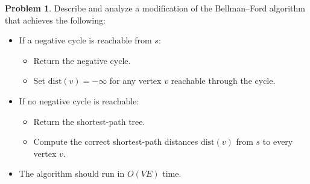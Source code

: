 \documentclass{article}
\theoremstyle{definition}
\newtheorem{problem}{Problem}
\begin{document}
\newpage


\begin{problem}
Describe and analyze a modification of the Bellman–Ford algorithm that achieves the following:
\begin{itemize}
    \item If a negative cycle is reachable from \( s \):
    \begin{itemize}
        \item Return the negative cycle.
        \item Set \( \text{dist}(v) = -\infty \) for any vertex \( v \) reachable through the cycle.
    \end{itemize}
    \item If no negative cycle is reachable:
    \begin{itemize}
        \item Return the shortest-path tree.
        \item Compute the correct shortest-path distances \( \text{dist}(v) \) from \( s \) to every vertex \( v \).
    \end{itemize}
    \item The algorithm should run in \( O(VE) \) time.
\end{itemize}


\end{problem}
\end{document}
